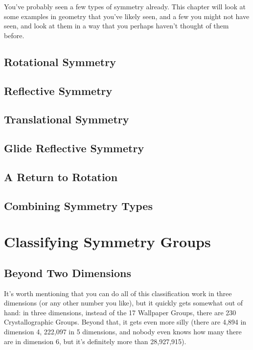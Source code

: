 You've probably seen a few types of symmetry already. This chapter will look at some examples in geometry that you've likely seen, and a few you might not have seen, and look at them in a way that you perhaps haven't thought of them before.

\section{Rotational Symmetry}


\section{Reflective Symmetry}


\section{Translational Symmetry}


\section{Glide Reflective Symmetry}\label{glideref}


\section{A Return to Rotation}


\section{Combining Symmetry Types}\label{combine}


\chapter{Classifying Symmetry Groups}



\section{Beyond Two Dimensions}
It's worth mentioning that you can do all of this classification work in three dimensions (or any other number you like), but it quickly gets somewhat out of hand: in three dimensions, instead of the 17 Wallpaper Groups, there are 230 Crystallographic Groups. Beyond that, it gets even more silly (there are 4,894 in dimension 4, 222,097 in 5 dimensions, and nobody even knows how many there are in dimension 6, but it's definitely more than 28,927,915). 
